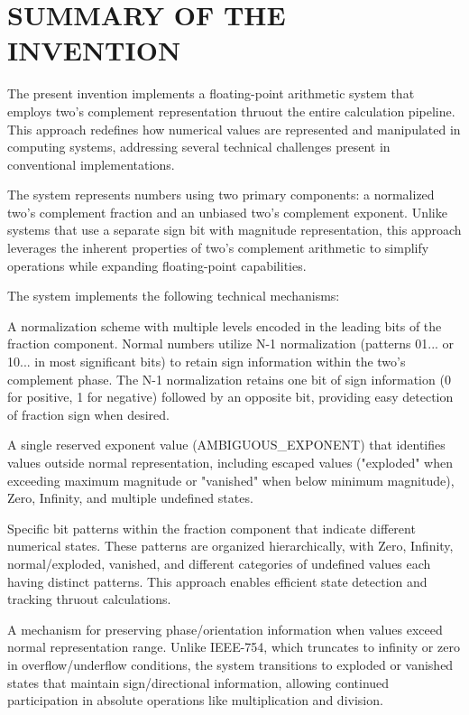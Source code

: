\documentclass[12pt,letter]{article}
\begin{document}
\newpage

\section{SUMMARY OF THE INVENTION}

The present invention implements a floating-point arithmetic system that employs two's complement representation thruout the entire calculation pipeline. This approach redefines how numerical values are represented and manipulated in computing systems, addressing several technical challenges present in conventional implementations.

The system represents numbers using two primary components: a normalized two's complement fraction and an unbiased two's complement exponent. Unlike systems that use a separate sign bit with magnitude representation, this approach leverages the inherent properties of two's complement arithmetic to simplify operations while expanding floating-point capabilities.

The system implements the following technical mechanisms:

A normalization scheme with multiple levels encoded in the leading bits of the fraction component. Normal numbers utilize N-1 normalization (patterns 01... or 10... in most significant bits) to retain sign information within the two's complement phase. The N-1 normalization retains one bit of sign information (0 for positive, 1 for negative) followed by an opposite bit, providing easy detection of fraction sign when desired.

A single reserved exponent value (AMBIGUOUS\_EXPONENT) that identifies values outside normal representation, including escaped values ("exploded" when exceeding maximum magnitude or "vanished" when below minimum magnitude), Zero, Infinity, and multiple undefined states.

Specific bit patterns within the fraction component that indicate different numerical states. These patterns are organized hierarchically, with Zero, Infinity, normal/exploded, vanished, and different categories of undefined values each having distinct patterns. This approach enables efficient state detection and tracking thruout calculations.

A mechanism for preserving phase/orientation information when values exceed normal representation range. Unlike IEEE-754, which truncates to infinity or zero in overflow/underflow conditions, the system transitions to exploded or vanished states that maintain sign/directional information, allowing continued participation in absolute operations like multiplication and division.
\end{document}

